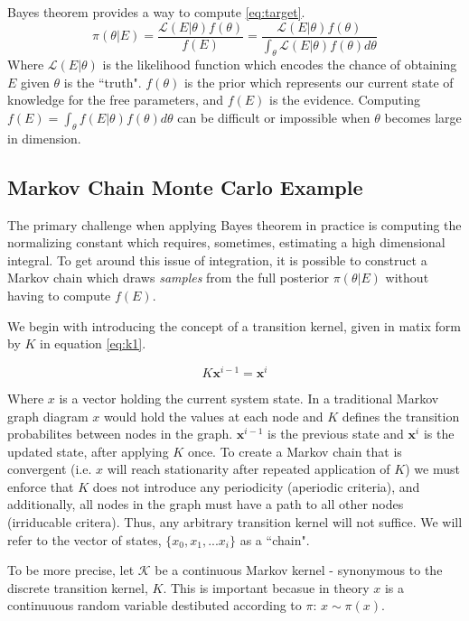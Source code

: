 \documentclass[10pt,a4paper]{report}
\begin{document}
Bayes theorem provides a way to compute \ref{eq:target}.
\begin{equation}
    \pi(\theta| E) = \frac{\mathcal{L}(E|\theta)f(\theta)}{f(E)} = \frac{\mathcal{L}(E|\theta)f(\theta)}{\int_\theta \mathcal{L}(E|\theta) f(\theta)d\theta}
\end{equation}
Where $\mathcal{L}(E|\theta)$ is the likelihood function which encodes the chance of obtaining $E$ given $\theta$ is the ``truth". $f(\theta)$ is the prior which represents our current state of knowledge for the free parameters, and $f(E)$ is the evidence.
Computing $f(E)= \int_\theta f(E|\theta) f(\theta)d\theta$ can be difficult or impossible when $\theta$ becomes large in dimension.

\subsection{Markov Chain Monte Carlo Example}

The primary challenge when applying Bayes theorem in practice is computing the normalizing constant which requires, sometimes, estimating a high dimensional integral.   To get around this issue of integration, it is possible to construct a Markov chain which draws \emph{samples} from the full posterior $\pi(\theta|E)$ without having to compute $f(E)$.  

We begin with introducing the concept of a transition kernel, given in matix form by $K$ in equation \ref{eq:k1}. 

\begin{equation}
K \mathbf x^{i-1} = \mathbf x^{i}
\label{eq:k1}
\end{equation}

Where $x$ is a vector holding the current system state.  In a traditional Markov graph diagram $x$ would hold the values at each node and $K$ defines the transition probabilites between nodes in the graph.  $\mathbf x^{i-1}$ is the previous state and $\mathbf x^{i}$ is the updated state, after applying $K$ once.  To create a Markov chain that is convergent (i.e. $x$ will reach stationarity after repeated application of $K$) we must enforce that $K$ does not introduce any periodicity (aperiodic criteria), and additionally, all nodes in the graph must have a path to all other nodes (irriducable critera). Thus, any arbitrary transition kernel will not suffice.  We will refer to the vector of states, $\{x_0, x_1, ... x_i\}$ as a ``chain".  

To be more precise, let $\mathcal{K} $ be a continuous Markov kernel - synonymous to the discrete transition kernel, $K$.  This is important becasue in theory $x$ is a continuuous random variable destibuted according to $\pi$: $x \sim  \pi(x)$.
\end{document}
